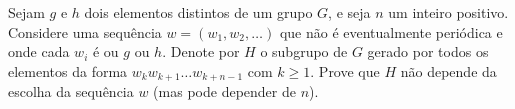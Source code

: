 Sejam \(g\) e \(h\) dois elementos distintos de um grupo \(G\), e seja \(n\) um inteiro positivo. Considere uma sequência \(w = (w_1, w_2, \ldots)\) que não é eventualmente periódica e onde cada \(w_i\) é ou \(g\) ou \(h\). Denote por \(H\) o subgrupo de \(G\) gerado por todos os elementos da forma \(w_k w_{k+1} \ldots w_{k+n-1}\) com \(k \ge 1\). Prove que \(H\) não depende da escolha da sequência \(w\) (mas pode depender de \(n\)).
